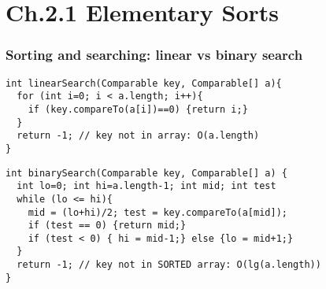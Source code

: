 \documentclass[handout]{beamer}
\begin{document}
\section{Ch.2.1 Elementary Sorts}



\begin{frame}[fragile]
    \frametitle{Sorting and searching: linear vs  binary search}
\small
\begin{verbatim}
int linearSearch(Comparable key, Comparable[] a){
  for (int i=0; i < a.length; i++){ 
    if (key.compareTo(a[i])==0) {return i;}
  }
  return -1; // key not in array: O(a.length)
}    
\end{verbatim}
\begin{verbatim}
int binarySearch(Comparable key, Comparable[] a) {
  int lo=0; int hi=a.length-1; int mid; int test
  while (lo <= hi){
    mid = (lo+hi)/2; test = key.compareTo(a[mid]);
    if (test == 0) {return mid;}
    if (test < 0) { hi = mid-1;} else {lo = mid+1;}
  }
  return -1; // key not in SORTED array: O(lg(a.length))
}    
\end{verbatim}
\end{frame}
\end{document}

